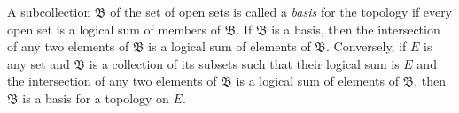 A subcollection $\mathfrak{B}$ of the set of open sets is called a \textit{basis} for the topology if every open set is a logical sum of members of $\mathfrak{B}$. If $\mathfrak{B}$ is a basis, then the intersection of any two elements of $\mathfrak{B}$ is a logical sum of elements of $\mathfrak{B}$. Conversely, if $E$ is any set and $\mathfrak{B}$ is a collection of its subsets such that their logical sum is $E$ and the intersection of any two elements of $\mathfrak{B}$ is a logical sum of elements of $\mathfrak{B}$, then $\mathfrak{B}$ is a basis for a topology on $E$.

